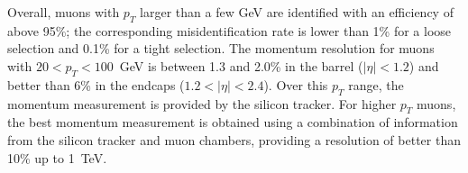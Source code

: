 Overall, muons with $p_T$ larger than a few GeV are identified with an efficiency of above 95\%; the corresponding misidentification rate is lower than 1\% for a loose selection and 0.1\% for a tight selection. The momentum resolution for muons with $20<p_T<100$~GeV is between 1.3 and 2.0\% in the barrel ($|\eta|<1.2$) and better than 6\% in the endcaps ($1.2<|\eta|<2.4$). Over this $p_T$ range, the momentum measurement is provided by the silicon tracker. For higher $p_T$ muons, the best momentum measurement is obtained using a combination of information from the silicon tracker and muon chambers, providing a resolution of better than 10\% up to 1~TeV.



